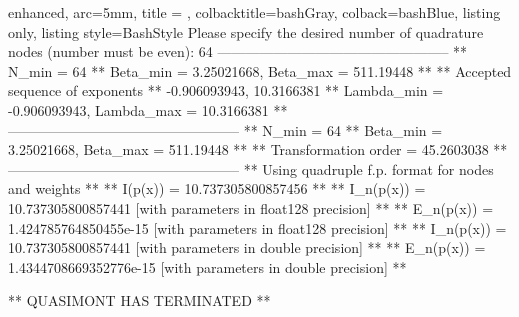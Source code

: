 \documentclass[a4paper, twosided]{book}
\begin{document}
\newpage
\begin{tcblisting}{enhanced,
                   arc=5mm,
                   title = \color{black}{\large \ttfamily Building and executing the test driver: p\_2(x)},
                   colbacktitle=bashGray,
                   colback=bashBlue,
                   listing only,
                   listing style=BashStyle}
Please specify the desired number of quadrature nodes (number must be even): 64
 --------------------------------------------------
 ** N_min = 64
 ** Beta_min = 3.25021668, Beta_max = 511.19448 **
 ** Accepted sequence of exponents ** 
    {-0.906093943, 10.3166381}
 ** Lambda_min = -0.906093943, Lambda_max = 10.3166381 **
 --------------------------------------------------
 ** N_min = 64
 ** Beta_min = 3.25021668, Beta_max = 511.19448 **
 ** Transformation order = 45.2603038 **
 --------------------------------------------------
 ** Using quadruple f.p. format for nodes and weights **
 ** I(p(x))   = 10.737305800857456 **
 ** I_n(p(x)) = 10.737305800857441     [with parameters in float128 precision] **
 ** E_n(p(x)) = 1.424785764850455e-15  [with parameters in float128 precision] **
 ** I_n(p(x)) = 10.737305800857441     [with parameters in double precision] **
 ** E_n(p(x)) = 1.4344708669352776e-15 [with parameters in double precision] **

 ** QUASIMONT HAS TERMINATED **
\end{tcblisting}
\end{document}
